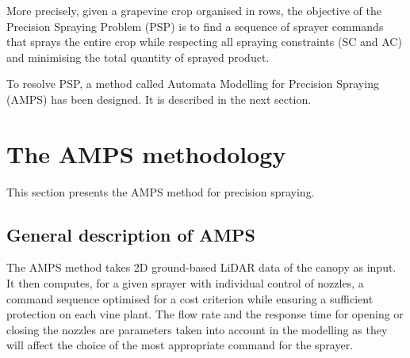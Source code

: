 \documentclass[preprint,3p,times,twocolumn]{elsarticle}
\begin{document}
More precisely, given a grapevine crop organised in rows, the objective of the Precision Spraying Problem (PSP) is to find a sequence of sprayer commands that sprays the entire crop while respecting all spraying constraints (SC and AC) and minimising the total quantity of sprayed product. 

To resolve PSP, a method called Automata Modelling for Precision Spraying (AMPS) has been designed. It is described in the next section.


\section{The AMPS methodology} 
\label{sec:AMPSmethodo}

This section presents the AMPS method for precision spraying.

\subsection{General description of AMPS}
The AMPS method takes 2D ground-based LiDAR data of the canopy as input. It then computes, for a given sprayer with individual control of nozzles, a command sequence optimised for a cost criterion while ensuring a sufficient protection on each vine plant. The flow rate and the response time for opening or closing the nozzles are parameters taken into account in the modelling as they will affect the choice of the most appropriate command for the sprayer.
\end{document}
